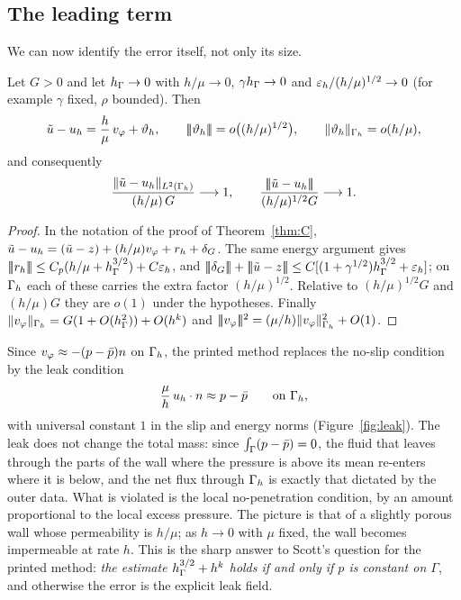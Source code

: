 \subsection{The leading term}
We can now identify the error itself, not only its size.

\begin{corollary}\label{cor:Bp}
Let $G>0$ and let $h_\Gamma\to0$ with $h/\mu\to0$, $\gamma h_\Gamma\to0$ and $\varepsilon_h/(h/\mu)^{1/2}\to0$ (for example $\gamma$ fixed, $\rho$ bounded). Then
\[
\tilde u-u_h=\frac h\mu\,v_\varphi+\vartheta_h,\qquad |\!|\!|\vartheta_h|\!|\!|=o\bigl((h/\mu)^{1/2}\bigr),\qquad \lVert \vartheta_h\rVert_{\Gamma_h}=o(h/\mu),
\]
and consequently
\[
\frac{\lVert \tilde u-u_h\rVert_{L^2(\Gamma_h)}}{(h/\mu)\,G}\longrightarrow1,\qquad\frac{|\!|\!|\tilde u-u_h|\!|\!|}{(h/\mu)^{1/2}G}\longrightarrow1 .
\]
\end{corollary}

\begin{proof}
In the notation of the proof of Theorem~\ref{thm:C}, $\tilde u-u_h=(\tilde u-z)+(h/\mu)v_\varphi+r_h+\delta_G$. The same energy argument gives $|\!|\!|r_h|\!|\!|\le C_p(h/\mu+h_\Gamma^{3/2})+C\varepsilon_h$, and $\tnorm{\delta_G}+\tnorm{\ut-z}\le C[(1+\gamma^{1/2})\hG^{3/2}+\eps]$; on $\Gamma_h$ each of these carries the extra factor $(h/\mu)^{1/2}$. Relative to $(h/\mu)^{1/2}G$ and $(h/\mu)G$ they are $o(1)$ under the hypotheses. Finally $\lVert v_\varphi\rVert_{\Gamma_h}=G(1+O(h_\Gamma^2))+O(h^k)$ and $|\!|\!|v_\varphi|\!|\!|^2=(\mu/h)\lVert v_\varphi\rVert^2_{\Gamma_h}+O(1)$.
\end{proof}

Since $v_\varphi\approx-(p-\bar p)n$ on $\Gamma_h$, the printed method replaces the no-slip condition by the leak condition
\[
\frac\mu h\,u_h\cdot n\approx p-\bar p\qquad\text{on }\Gamma_h,
\]
with universal constant $1$ in the slip and energy norms (Figure~\ref{fig:leak}). The leak does not change the total mass: since $\int_\Gamma(p-\bar p)=0$, the fluid that leaves through the parts of the wall where the pressure is above its mean re-enters where it is below, and the net flux through $\Gamma_h$ is exactly that dictated by the outer data. What is violated is the local no-penetration condition, by an amount proportional to the local excess pressure. The picture is that of a slightly porous wall whose permeability is $h/\mu$; as $h\to0$ with $\mu$ fixed, the wall becomes impermeable at rate $h$. This is the sharp answer to Scott's question for the printed method: \emph{the estimate $h_\Gamma^{3/2}+h^k$ holds if and only if $p$ is constant on $\Gamma$}, and otherwise the error is the explicit leak field.

